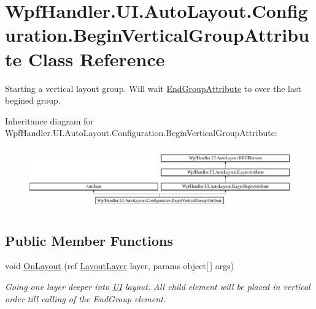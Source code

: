 \hypertarget{class_wpf_handler_1_1_u_i_1_1_auto_layout_1_1_configuration_1_1_begin_vertical_group_attribute}{}\section{Wpf\+Handler.\+U\+I.\+Auto\+Layout.\+Configuration.\+Begin\+Vertical\+Group\+Attribute Class Reference}
\label{class_wpf_handler_1_1_u_i_1_1_auto_layout_1_1_configuration_1_1_begin_vertical_group_attribute}


Starting a vertical layout group. Will wait \mbox{\hyperlink{class_wpf_handler_1_1_u_i_1_1_auto_layout_1_1_configuration_1_1_end_group_attribute}{End\+Group\+Attribute}} to over the last begined group.  


Inheritance diagram for Wpf\+Handler.\+U\+I.\+Auto\+Layout.\+Configuration.\+Begin\+Vertical\+Group\+Attribute\+:\begin{figure}[H]
\begin{center}
\leavevmode
\includegraphics[height=2.718446cm]{de/db7/class_wpf_handler_1_1_u_i_1_1_auto_layout_1_1_configuration_1_1_begin_vertical_group_attribute}
\end{center}
\end{figure}
\subsection*{Public Member Functions}
\begin{DoxyCompactItemize}
\item 
void \mbox{\hyperlink{class_wpf_handler_1_1_u_i_1_1_auto_layout_1_1_configuration_1_1_begin_vertical_group_attribute_a52859bc4d83f107cbae35d20ae97ce83}{On\+Layout}} (ref \mbox{\hyperlink{class_wpf_handler_1_1_u_i_1_1_auto_layout_1_1_layout_layer}{Layout\+Layer}} layer, params object\mbox{[}$\,$\mbox{]} args)
\begin{DoxyCompactList}\small\item\em Going one layer deeper into \mbox{\hyperlink{namespace_wpf_handler_1_1_u_i}{UI}} layout. All child element will be placed in vertical order till calling of the End\+Group element. \end{DoxyCompactList}\end{DoxyCompactItemize}
